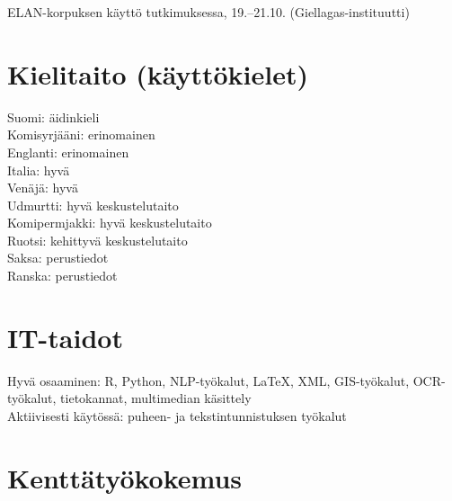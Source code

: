 \documentclass[11pt, a4paper]{article}
\newcommand{\years}[1]{\marginnote{\scriptsize #1}} %
\begin{document}
\years{2015} ELAN-korpuksen käyttö tutkimuksessa, 19.--21.10. (Giellagas-instituutti)






\section*{Kielitaito (käyttökielet)}

Suomi: äidinkieli\\
Komisyrjääni: erinomainen\\
Englanti: erinomainen\\
Italia: hyvä\\
Venäjä: hyvä\\
Udmurtti: hyvä keskustelutaito\\
Komipermjakki: hyvä keskustelutaito\\
Ruotsi: kehittyvä keskustelutaito\\
Saksa: perustiedot\\
Ranska: perustiedot\\

\section*{IT-taidot}

Hyvä osaaminen: R, Python, NLP-työkalut, LaTeX, XML, GIS-työkalut, OCR-työkalut, tietokannat, multimedian käsittely\\
Aktiivisesti käytössä: puheen- ja tekstintunnistuksen työkalut

\section*{Kenttätyökokemus}
\end{document}
